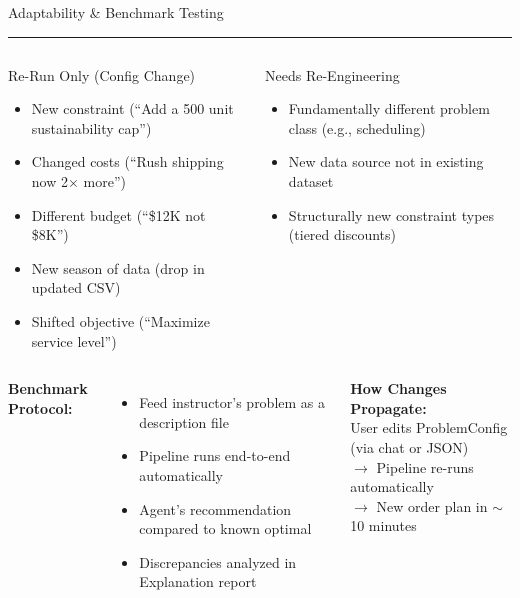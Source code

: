 \documentclass[aspectratio=169, 9pt]{beamer}
\newcommand{\goldrule}{\textcolor{PurdueGold}{\rule{\linewidth}{1.2pt}}}
\begin{document}
\begin{frame}{Adaptability \& Benchmark Testing}
\goldrule
\vspace{2pt}
\begin{columns}[T]
\begin{block}{Re-Run Only (Config Change)}
\scriptsize
\begin{itemize}
  \item New constraint {\tiny(``Add a 500 unit sustainability cap'')}
  \item Changed costs {\tiny(``Rush shipping now 2$\times$ more'')}
  \item Different budget {\tiny(``\$12K not \$8K'')}
  \item New season of data {\tiny(drop in updated CSV)}
  \item Shifted objective {\tiny(``Maximize service level'')}
\end{itemize}
\end{block}

\begin{alertblock}{Needs Re-Engineering}
\scriptsize
\begin{itemize}
  \item Fundamentally different problem class {\tiny(e.g., scheduling)}
  \item New data source not in existing dataset
  \item Structurally new constraint types {\tiny(tiered discounts)}
\end{itemize}
\end{alertblock}
\end{columns}

\vspace{4pt}
\begin{columns}[T]
{\small\textbf{\color{AgedGold}Benchmark Protocol:}}
\begin{itemize}\scriptsize
  \item Feed instructor's problem as a description file
  \item Pipeline runs end-to-end automatically
  \item Agent's recommendation compared to known optimal
  \item Discrepancies analyzed in Explanation report
\end{itemize}

{\small\textbf{\color{AgedGold}How Changes Propagate:}}\\[2pt]
{\scriptsize User edits ProblemConfig (via chat or JSON)\\
$\rightarrow$ Pipeline re-runs automatically\\
$\rightarrow$ New order plan in ${\sim}$10 minutes}
\end{columns}
\end{frame}
\end{document}
